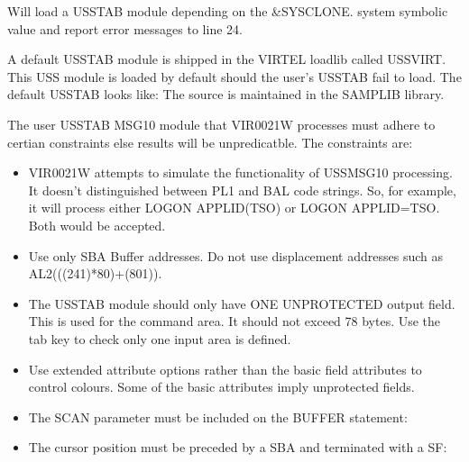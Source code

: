 \documentclass[letterpaper,10pt,english]{sphinxmanual}
\begin{document}
\sphinxAtStartPar
Will load a USSTAB module depending on the \&SYSCLONE. system symbolic value and report error messages to line 24.

\sphinxAtStartPar
{}
A default USSTAB module is shipped in the VIRTEL loadlib called USSVIRT. This USS module is loaded by default should the user’s USSTAB fail to load. The default USSTAB looks like:\sphinxhyphen{} The source is maintained in the SAMPLIB library.

\sphinxAtStartPar
{}

\sphinxAtStartPar
{}

\sphinxAtStartPar
The user USSTAB MSG10 module that VIR0021W processes must adhere to certian constraints else results will be unpredicatble. The constraints are:\sphinxhyphen{}
\begin{itemize}
\item {} 
\sphinxAtStartPar
VIR0021W attempts to simulate the functionality of USSMSG10 processing. It doesn’t distinguished between PL1 and BAL code strings. So, for example, it will process either  LOGON APPLID(TSO) or LOGON APPLID=TSO. Both would be accepted.

\item {} 
\sphinxAtStartPar
Use only SBA Buffer addresses. Do not use displacement addresses such as AL2(((24\sphinxhyphen{}1)*80)+(80\sphinxhyphen{}1)).

\item {} 
\sphinxAtStartPar
The USSTAB module should only have ONE UNPROTECTED output field. This is used for the command area. It should not exceed 78 bytes. Use the tab key to check only one input area is defined.

\item {} 
\sphinxAtStartPar
Use extended attribute options rather than the basic field attributes to control colours. Some of the basic attributes imply unprotected fields.

\item {} 
\sphinxAtStartPar
The SCAN parameter must be included on the BUFFER statement:\sphinxhyphen{}

\end{itemize}

\begin{sphinxVerbatim}[commandchars=\\\{\}]
      
\end{sphinxVerbatim}
\begin{itemize}
\item {} 
\sphinxAtStartPar
The cursor position must be preceded by a SBA and terminated with a SF:\sphinxhyphen{}

\end{itemize}
\end{document}
